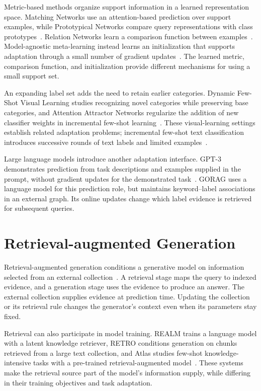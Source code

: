 Metric-based methods organize support information in a learned representation space. Matching Networks use an attention-based prediction over support examples, while Prototypical Networks compare query representations with class prototypes~\cite{lit-vinyals2016matching,lit-snell2017prototypical}. Relation Networks learn a comparison function between examples~\cite{lit-sung2018learning}. Model-agnostic meta-learning instead learns an initialization that supports adaptation through a small number of gradient updates~\cite{lit-finn2017model}. The learned metric, comparison function, and initialization provide different mechanisms for using a small support set.

An expanding label set adds the need to retain earlier categories. Dynamic Few-Shot Visual Learning studies recognizing novel categories while preserving base categories, and Attention Attractor Networks regularize the addition of new classifier weights in incremental few-shot learning~\cite{lit-gidaris2018dynamic,lit-ren2019incremental}. These visual-learning settings establish related adaptation problems; incremental few-shot text classification introduces successive rounds of text labels and limited examples~\cite{gorag-xia-etal-2021-incremental}.

Large language models introduce another adaptation interface. GPT-3 demonstrates prediction from task descriptions and examples supplied in the prompt, without gradient updates for the demonstrated task~\cite{lit-brown2020language}. GORAG uses a language model for this prediction role, but maintains keyword--label associations in an external graph. Its online updates change which label evidence is retrieved for subsequent queries.

\section{Retrieval-augmented Generation}
\label{sec:background:rag}

Retrieval-augmented generation conditions a generative model on information selected from an external collection~\cite{bg-rag}. A retrieval stage maps the query to indexed evidence, and a generation stage uses the evidence to produce an answer. The external collection supplies evidence at prediction time. Updating the collection or its retrieval rule changes the generator's context even when its parameters stay fixed.

Retrieval can also participate in model training. REALM trains a language model with a latent knowledge retriever, RETRO conditions generation on chunks retrieved from a large text collection, and Atlas studies few-shot knowledge-intensive tasks with a pre-trained retrieval-augmented model~\cite{lit-guu2020retrieval,lit-borgeaud2022improving,lit-izacard2023atlas}. These systems make the retrieval source part of the model's information supply, while differing in their training objectives and task adaptation.

